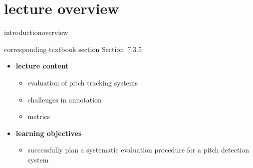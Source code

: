 


\subtitle{Module 7.3.5: Fundamental Frequency Detection~---~Evaluation}


	

    \section[overview]{lecture overview}
        \begin{frame}{introduction}{overview}
            \begin{block}{corresponding textbook section}
                    Section~7.3.5
            \end{block}

            \begin{itemize}
                \item   \textbf{lecture content}
                    \begin{itemize}
                        \item   evaluation of pitch tracking  systems
                        \item   challenges in annotation
                        \item   metrics
                    \end{itemize}
                \bigskip
                \item<2->   \textbf{learning objectives}
                    \begin{itemize}
                        \item   successfully plan a systematic evaluation procedure for a pitch detection system
                    \end{itemize}
            \end{itemize}
        \end{frame}
        
